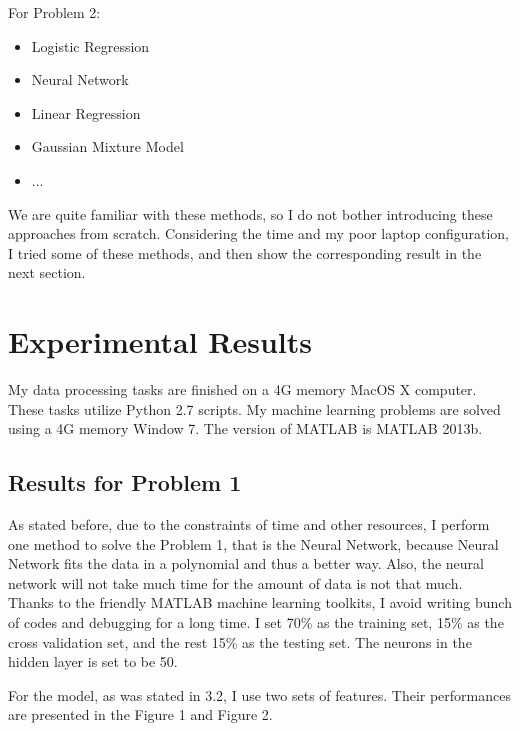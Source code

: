 \documentclass{sig-alternate}
\begin{document}
For Problem 2:
\begin{itemize}
	\item Logistic Regression
    \item Neural Network
    \item Linear Regression
    \item Gaussian Mixture Model
    \item ...
\end{itemize}

We are quite familiar with these methods, so I do not bother introducing these approaches from scratch. Considering the time and my poor laptop configuration, I tried some of these methods, and then show the corresponding result in the next section.




\section{Experimental Results}
My data processing tasks are finished on a 4G memory MacOS X computer. These tasks utilize Python 2.7 scripts. My machine learning problems are solved using a 4G memory Window 7. The version of MATLAB is MATLAB 2013b.

\subsection{Results for Problem 1}
As stated before, due to the constraints of time and other resources, I perform one method to solve the Problem 1, that is the Neural Network, because Neural Network fits the data in a polynomial and thus a better way. Also, the neural network will not take much time for the amount of data is not that much. Thanks to the friendly MATLAB machine learning toolkits\cite{nn}, I avoid writing bunch of codes and debugging for a long time. I set 70\% as the training set, 15\% as the cross validation set, and the rest 15\% as the testing set. The neurons in the hidden layer is set to be 50.

For the model, as was stated in 3.2, I use two sets of features. Their performances are presented in the Figure 1 and Figure 2.
\end{document}

